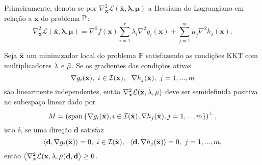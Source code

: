 Primeiramente, denota-se por $\nabla_{\mathbf{x}}^2 \mathcal{L}(\bar{\mathbf{x}},\mathbf{\lambda},\mathbf{\mu})$ a Hessiana do Lagrangiano em rela\c{c}\~{a}o a $\mathbf{x}$ do problema $\mathbb{P}$:
\begin{equation*}
\nabla_{\mathbf{x}}^2 \mathcal{L}(\bar{\mathbf{x}},\mathbf{\lambda},\mathbf{\mu}) = \nabla^2 f(\mathbf{x}) \sum_{i=1}^{r} \lambda_i \nabla^2 g_i(\mathbf{x}) + \sum_{j=1}^{m} \mu_j \nabla^2 h_j(\mathbf{x}).
\end{equation*}

\begin{theorem}
Seja $\bar{\mathbf{x}}$ um minimizador local do problema $\mathbb{P}$ satisfazendo as condi\c{c}\~{o}es KKT com multiplicadores $\bar{\mathbf{\lambda}}$ e $\bar{\mathbf{\mu}}$. Se os gradientes das condi\c{c}\~{o}es ativas
\begin{equation*}
\nabla g_i(\bar{\mathbf{x}}),~i \in \mathcal{I}(\bar{\mathbf{x}}),~~\nabla h_j(\bar{\mathbf{x}}),~j = 1,...,m
\end{equation*}
s\~{a}o linearmente independentes, ent\~{a}o $\nabla_{\mathbf{x}}^{2} \mathcal{L}(\bar{\mathbf{x}},\bar{\mathbf{\lambda}},\bar{\mathbf{\mu}})$ deve ser semidefinida positiva no subespa\c{c}o linear dado por
\begin{equation*}
M = \left(\text{span}\left\lbrace\nabla g_i(\bar{\mathbf{x}}),i \in \mathcal{I}(\bar{\mathbf{x}}),\nabla h_j(\bar{\mathbf{x}}),j = 1,...,m\right\rbrace\right)^{\bot},
\end{equation*}
isto \'{e}, se uma dire\c{c}\~{a}o $\mathbf{d}$ satisfaz 
\begin{equation*}
\left\langle\mathbf{d},\nabla g_i(\bar{\mathbf{x}})\right\rangle = 0,~i \in \mathcal{I}(\bar{\mathbf{x}}),~~ \left\langle\mathbf{d},\nabla h_j(\bar{\mathbf{x}})\right\rangle = 0,~j = 1,...,m,
\end{equation*}
ent\~{a}o $\left\langle\nabla_{\mathbf{x}}^{2} \mathcal{L}(\bar{\mathbf{x}},\bar{\mathbf{\lambda}},\bar{\mathbf{\mu}})\mathbf{d},\mathbf{d}\right\rangle \ge 0$.
\end{theorem}

